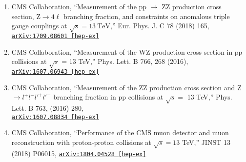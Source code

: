 \documentclass[10pt]{res} %
\begin{document}
\begin{resume}
\begin{enumerate}
  \item CMS Collaboration, ``Measurement of the pp $\rightarrow$ ZZ production cross section, $\mathrm{Z} \to 4\ell$ branching fraction, and constraints on anomalous triple gauge couplings at $\sqrt{s} = 13~\mathrm{TeV}$,'' Eur. Phys. J. C 78 (2018) 165, \href{https://arxiv.org/abs/1709.08601}{\texttt{arXiv:1709.08601 [hep-ex]}}
  \item CMS Collaboration, ``Measurement of the WZ production cross section in pp collisions at $\sqrt{s}$ = 13 TeV,''
Phys. Lett. B 766, 268 (2016), \href{https://arxiv.org/abs/1607.06943}{\texttt{arXiv:1607.06943 [hep-ex]}}
  \item CMS Collaboration, ``Measurement of the ZZ production cross section and Z $\rightarrow l^{+}l^{-}l'^{+}l'^{-}$ branching fraction in pp collisions at $\sqrt{s} =$ 13 TeV,''
Phys. Lett. B 763, (2016) 280, \\ \href{https://arxiv.org/abs/1607.08834} {\texttt{arXiv:1607.08834 [hep-ex]}}
  \item CMS Collaboration, ``Performance of the CMS muon detector and muon reconstruction with proton-proton collisions at $\sqrt{s} = 13$ TeV,''
JINST 13 (2018) P06015, \href{https://arxiv.org/abs/1804.04528} {\texttt{arXiv:1804.04528 [hep-ex]}}
\end{enumerate}


\end{resume}
\end{document}
